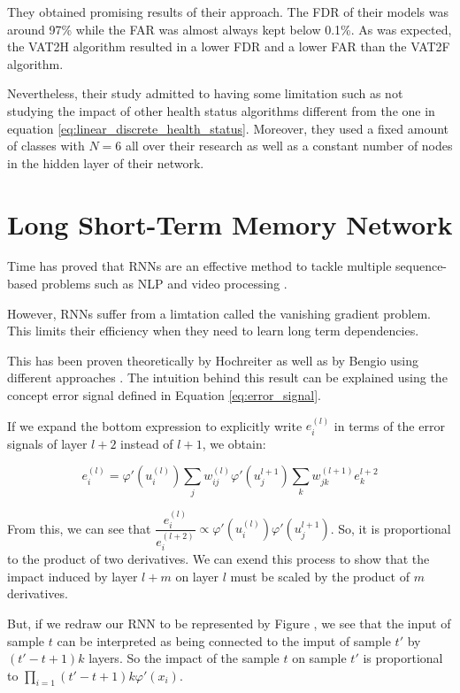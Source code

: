 They obtained promising results of their approach.
The FDR of their models was around 97\% while the FAR was almost always kept below 0.1\%.
As was expected, the VAT2H algorithm resulted in a lower FDR and a lower FAR than the VAT2F algorithm.

Nevertheless, their study admitted to having some limitation such as not studying the impact of other health status algorithms different from the one in equation \ref{eq:linear_discrete_health_status}.
Moreover, they used a fixed amount of classes with $N=6$ all over their research as well as a constant number of nodes in the hidden layer of their network.

\section{Long Short-Term Memory Network}\label{sec:lstm}

Time has proved that RNNs are an effective method to tackle multiple sequence-based problems such as NLP \cite{tarwani2017survey} and video processing \cite{yadav2022survey}.

However, RNNs suffer from a limtation called the vanishing gradient problem.
This limits their efficiency when they need to learn long term dependencies.

This has been proven theoretically by Hochreiter \cite{hochreiter1998vanishing} as well as by Bengio using different approaches \cite{bengio1993problem}.
The intuition behind this result can be explained using the concept error signal defined in Equation \ref{eq:error_signal}.

If we expand the bottom expression to explicitly write $e_i^{(l)}$ in terms of the error signals of layer $l+2$ instead of $l+1$, we obtain:

$$
    e_i^{(l)} = \varphi '(u_i^{(l)}) \sum_j w_{ij}^{(l)} \varphi '(u_j^{l+1}) \sum_k w_{jk}^{(l+1)} e_k^{l+2}
$$

From this, we can see that $\dfrac{e_i^{(l)}}{e_i^{(l+2)}} \propto \varphi '(u_i^{(l)})\varphi '(u_j^{l+1})$.
So, it is proportional to the product of two derivatives.
We can exend this process to show that the impact induced by layer $l + m$ on layer $l$ must be scaled by the product of $m$ derivatives.

But, if we redraw our RNN to be represented by Figure , we see that the input of sample $t$ can be interpreted as being connected to the imput of sample $t'$ by $(t'-t+1)k$ layers.
So the impact of the sample $t$ on sample $t'$ is proportional to $\prod_{i=1}{(t'-t+1)k}\varphi'(x_i)$.

